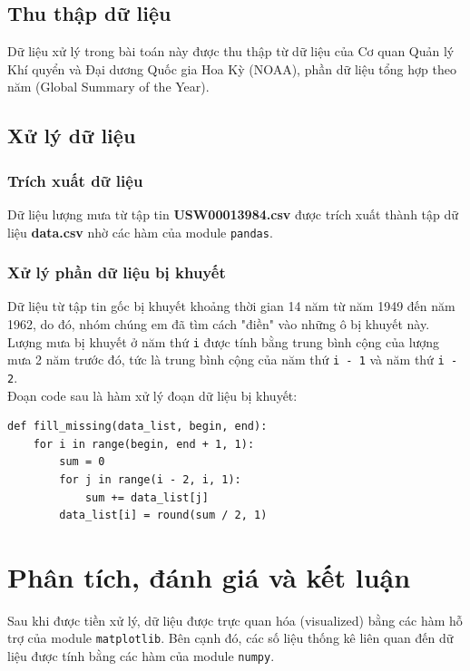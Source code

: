 \documentclass[a4paper]{article}
\begin{document}
\subsection{Thu thập dữ liệu}
Dữ liệu xử lý trong bài toán này được thu thập từ dữ liệu của Cơ quan Quản lý Khí quyển và Đại dương Quốc gia Hoa Kỳ (NOAA), phần dữ liệu tổng hợp theo năm (Global Summary of the Year).

\subsection{Xử lý dữ liệu}
\subsubsection{Trích xuất dữ liệu}
Dữ liệu lượng mưa từ tập tin \textbf{USW00013984.csv} được trích xuất thành tập dữ liệu \textbf{data.csv} nhờ các hàm của module \lstinline{pandas}.
\subsubsection{Xử lý phần dữ liệu bị khuyết}
Dữ liệu từ tập tin gốc bị khuyết khoảng thời gian 14 năm từ năm 1949 đến năm 1962, do đó, nhóm chúng em đã tìm cách "điền" vào những ô bị khuyết này. Lượng mưa bị khuyết ở năm thứ \lstinline{i} được tính bằng trung bình cộng của lượng mưa 2 năm trước đó, tức là trung bình cộng của năm thứ \lstinline{i - 1} và năm thứ \lstinline{i - 2}.\\
Đoạn code sau là hàm xử lý đoạn dữ liệu bị khuyết:
\begin{lstlisting}
def fill_missing(data_list, begin, end):
    for i in range(begin, end + 1, 1):
        sum = 0
        for j in range(i - 2, i, 1):
            sum += data_list[j]
        data_list[i] = round(sum / 2, 1)
\end{lstlisting}

\section{Phân tích, đánh giá và kết luận}
Sau khi được tiền xử lý, dữ liệu được trực quan hóa (visualized) bằng các hàm hỗ trợ của module \lstinline{matplotlib}. Bên cạnh đó, các số liệu thống kê liên quan đến dữ liệu được tính bằng các hàm của module \lstinline{numpy}.
\end{document}

